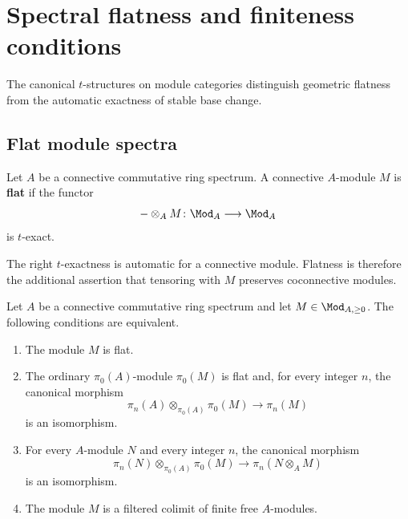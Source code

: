 \section{Spectral flatness and finiteness conditions}
\label{sec:spectral-flatness-finiteness}

The canonical $t$-structures on module categories distinguish geometric
flatness from the automatic exactness of stable base change.

\subsection{Flat module spectra}

\begin{definition}
\label{def:flat-module-spectrum}
Let $A$ be a connective commutative ring spectrum. A connective
$A$-module $M$ is \textbf{flat} if the functor
\[
    -\otimes_A M
    \colon
    \Mod_A
    \longrightarrow
    \Mod_A
\]
is $t$-exact.
\end{definition}

The right $t$-exactness is automatic for a connective module. Flatness is
therefore the additional assertion that tensoring with $M$ preserves
coconnective modules.

\begin{theorem}
\label{thm:spectral-lazard}
Let $A$ be a connective commutative ring spectrum and let
$M\in\Mod_{A,\geq0}$. The following conditions are equivalent.
\begin{enumerate}[label=(\roman*)]
    \item The module $M$ is flat.

    \item The ordinary $\pi_0(A)$-module $\pi_0(M)$ is flat and, for every
    integer $n$, the canonical morphism
    \[
        \pi_n(A)
        \otimes_{\pi_0(A)}
        \pi_0(M)
        \longrightarrow
        \pi_n(M)
    \]
    is an isomorphism.

    \item For every $A$-module $N$ and every integer $n$, the canonical
    morphism
    \[
        \pi_n(N)
        \otimes_{\pi_0(A)}
        \pi_0(M)
        \longrightarrow
        \pi_n(N\otimes_A M)
    \]
    is an isomorphism.

    \item The module $M$ is a filtered colimit of finite free
    $A$-modules.
\end{enumerate}
\end{theorem}

